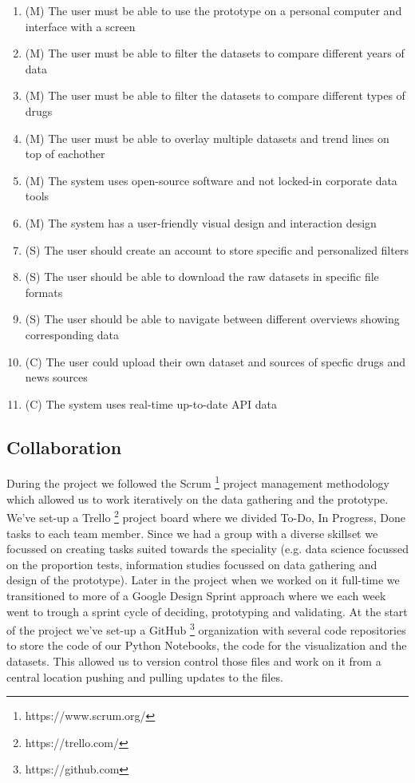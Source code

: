  \begin{enumerate}
   \item (M) The user must be able to use the prototype on a personal computer and interface with a screen
   \item (M) The user must be able to filter the datasets to compare different years of data
   \item (M) The user must be able to filter the datasets to compare different types of drugs
   \item (M) The user must be able to overlay multiple datasets and trend lines on top of eachother
   \item (M) The system uses open-source software and not locked-in corporate data tools
   \item (M) The system has a user-friendly visual design and interaction design
   \item (S) The user should create an account to store specific and personalized filters
   \item (S) The user should be able to download the raw datasets in specific file formats
   \item (S) The user should be able to navigate between different overviews showing corresponding data
   \item (C) The user could upload their own dataset and sources of specfic drugs and news sources
   \item (C) The system uses real-time up-to-date API data
 \end{enumerate}

 \subsection{Collaboration}

During the project we followed the Scrum \footnote{https://www.scrum.org/} project management methodology which allowed us to work iteratively on the data gathering and the prototype. We've set-up a Trello \footnote{https://trello.com/} project board where we divided To-Do, In Progress, Done tasks to each team member. Since we had a group with a diverse skillset we focussed on creating tasks suited towards the speciality (e.g. data science focussed on the proportion tests, information studies focussed on data gathering and design of the prototype). Later in the project when we worked on it full-time we transitioned to more of a Google Design Sprint approach where we each week went to trough a sprint cycle of deciding, prototyping and validating. At the start of the project we've set-up a GitHub \footnote{https://github.com} organization with several code repositories to store the code of our Python Notebooks, the code for the visualization and the datasets. This allowed us to version control those files and work on it from a central location pushing and pulling updates to the files.